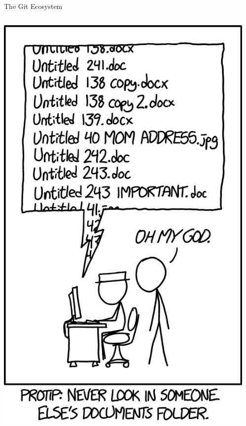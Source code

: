 \begin{frame}[t,fragile]{The Git Ecosystem}
  \vspace{-0.7cm}
  \begin{columns}
      \begin{center}
        \includegraphics[angle=0,width=\linewidth]{./Figs/git_0.png}
      \end{center}
      \begin{center}

\end{center}
\end{columns}
\end{frame}
